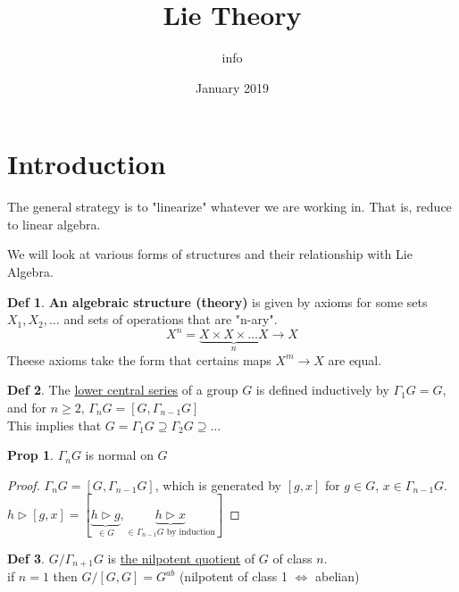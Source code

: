 \documentclass{article}
\title{Lie Theory}
\author{info }
\date{January 2019}
\theoremstyle{definition}
\newtheorem{definition}{Def}[section]
\newtheorem{proposition}{Prop}[section]
\theoremstyle{remark}
\begin{document}
\maketitle

\section{Introduction}
The general strategy is to "linearize" whatever we are working in. That is, reduce to linear algebra.

We will look at various forms of structures and their relationship with Lie Algebra. 

\begin{definition}
\textbf{An algebraic structure (theory)} is given by axioms for some sets $X_1, X_2, \ldots$ and sets of operations that are "n-ary". 
\begin{equation}
    X^n = \underbrace{X \times X \times \ldots X}_n \rightarrow X
\end{equation}
Theese axioms take the form that certains maps $X^m \rightarrow X$ are equal.
\end{definition}
\begin{definition}
The \underline{lower central series} of a group $G$ is defined inductively by $\Gamma _1 G = G$, and for $n \geq 2$, $\Gamma _n G = [G, \Gamma _{n-1} G]$ \\
This implies that $G = \Gamma _1 G \supseteq \Gamma _2 G \supseteq \ldots $
\end{definition}

\begin{proposition}
$\Gamma_n G $ is normal on $G$
\end{proposition}

\begin{proof}
$\Gamma _n G = [G, \Gamma _{n-1} G]$, which is generated by $[g,x]$ for $g\in G$, $x \in \Gamma _{n-1} G$. \\
$h \triangleright [g, x] = [ \underbrace{ h \triangleright g }_{\in G}, \underbrace{h \triangleright x}_{\in \Gamma _{n-1}G \text{ by induction}}]$
\end{proof}

\begin{definition}
$G/\Gamma _{n+1} G$ is \underline{the nilpotent quotient} of $G$ of class $n$. \\
if $n = 1$ then $G/[G, G] = G^{ab}$ (nilpotent of class 1 $\Leftrightarrow$ abelian) \\
\end{definition}
\end{document}
